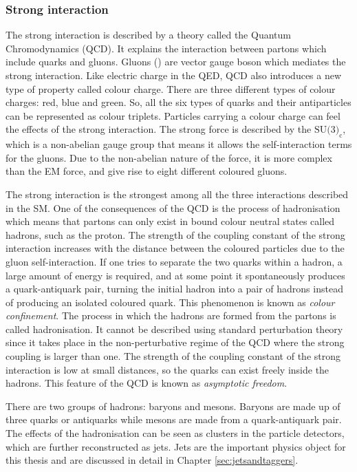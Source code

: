 \subsubsection{Strong interaction}%
\label{sec:theory:standardmodel:strong}
The strong interaction is described by a theory called the Quantum Chromodynamics (QCD). It explains the interaction between partons which include quarks and gluons. Gluons (\Pgluon) are vector gauge boson which mediates the strong interaction. Like electric charge in the QED, QCD also introduces a new type of property called colour charge. There are three different types of colour charges: red, blue and green. So, all the six types of quarks and their antiparticles can be represented as colour triplets. Particles carrying a colour charge can feel the effects of the strong interaction. The strong force is described by the $\text{SU(3)}_{\text{c}}$, which is a non-abelian gauge group that means it allows the self-interaction terms for the gluons. Due to the non-abelian nature of the force, it is more complex than the EM force, and give rise to eight different coloured gluons.~\cite{halzen}

The strong interaction is the strongest among all the three interactions described in the SM. One of the consequences of the QCD is the process of hadronisation which means that partons can only exist in bound colour neutral states called hadrons, such as the proton. The strength of the coupling constant of the strong interaction increases with the distance between the coloured particles due to the gluon self-interaction. If one tries to separate the two quarks within a hadron, a large amount of energy is required, and at some point it spontaneously produces a quark-antiquark pair, turning the initial hadron into a pair of hadrons instead of producing an isolated coloured quark. This phenomenon is known as \textit{colour confinement}. The process in which the hadrons are formed from the partons is called hadronisation. It cannot be described using standard perturbation theory since it takes place in the non-perturbative regime of the QCD where the strong coupling is larger than one. The strength of the coupling constant of the strong interaction is low at small distances, so the quarks can exist freely inside the hadrons. This feature of the QCD is known as \textit{asymptotic freedom}.~\cite{thomson}

There are two groups of hadrons: baryons and mesons. Baryons are made up of three quarks or antiquarks while mesons are made from a quark-antiquark pair. The effects of the hadronisation can be seen as clusters in the particle detectors, which are further reconstructed as jets. Jets are the important physics object for this thesis and are discussed in detail in Chapter \ref{sec:jetsandtaggers}.

